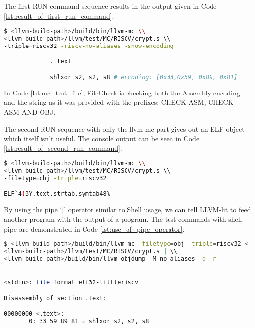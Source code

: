 The first RUN command sequence results in the output given in Code \ref{lst:result_of_first_run_command}.

\begin{minipage}{\linewidth}
\begin{lstlisting}[language=sh, caption={Result of first "RUN" command}, label={lst:result_of_first_run_command} ]
$ <llvm-build-path>/build/bin/llvm-mc \\
<llvm-build-path>/llvm/test/MC/RISCV/crypt.s \\ 
-triple=riscv32 -riscv-no-aliases -show-encoding

             . text

             shlxor s2, s2, s8 # encoding: [0x33,0x59, 0x89, 0x81]
\end{lstlisting}
\end{minipage}

In Code \ref{lst:mc_test_file}, FileCheck is checking both the Assembly encoding and the string as it was provided with the prefixes: CHECK-ASM, CHECK-ASM-AND-OBJ.


The second RUN sequence with only the llvm-mc part gives out an ELF object which itself isn’t useful. The console output can be seen in Code \ref{lst:result_of_second_run_command}.


\begin{lstlisting}[language=sh, caption={Result of second "RUN" command}, label={lst:result_of_second_run_command} ]
$ <llvm-build-path>/build/bin/llvm-mc \\
<llvm-build-path>/llvm/test/MC/RISCV/crypt.s \\ 
-filetype=obj -triple=riscv32 

ELF`4(3Y.text.strtab.symtab48%
\end{lstlisting}
By using the pipe ‘|’ operator similar to Shell usage, we can tell LLVM-lit to feed another program with the output of a program. The test commands with shell pipe are demonstrated in Code \ref{lst:use_of_pipe_operator}.


\begin{lstlisting}[language=sh, caption={Use of pipe operator in Shell}, label={lst:use_of_pipe_operator} ]
$ <llvm-build-path>/build/bin/llvm-mc -filetype=obj -triple=riscv32 <
<llvm-build-path>/llvm/test/MC/RISCV/crypt.s | \\
<llvm-build-path>/build/bin/llvm-objdump -M no-aliases -d -r -


<stdin>: file format elf32-littleriscv

Disassembly of section .text:

00000000 <.text>:
       0: 33 59 89 81 = shlxor s2, s2, s8
\end{lstlisting}


